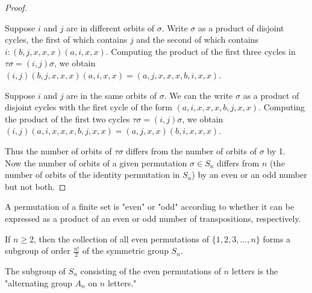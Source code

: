 \documentclass[a4paper,11pt]{article}
\begin{document}
\begin{outline}
\begin{proof}
      \begin{proofcases}
      
        \item 
          Suppose \(i\) and \(j\) are in different orbits of \(\sigma\). Write \(\sigma\) as a product of
          disjoint cycles, the first of which contains \(j\) and the second of which 
          contains \(i: (b, j, x, x, x)(a, i, x, x)\). Computing the product of the first three cycles in
          \(\tau\sigma = (i, j)\sigma\), we obtain\\ \((i, j)(b, j, x, x, x)(a, i, x, x) = (a, j, x, x, x, b, i, x, x)\).
          
        \item
          Suppose \(i\) and \(j\) are in the same orbits of \(\sigma\). We can the write \(\sigma\) as a product of
          disjoint cycles with the first cycle of the form \((a, i, x, x, x, b, j, x, x)\). Computing the product of
          the first two cycles \(\tau\sigma = (i, j)\sigma\), we obtain \((i, j)(a, i, x, x, x, b, j, x, x) =
          (a, j, x, x)(b, i, x, x, x)\).
      
      \end{proofcases}
      
      Thus the number of orbits of \(\tau\sigma\) differs from the number of orbits of \(\sigma\) by 1.\\
      Now the number of orbits of a given permutation \(\sigma \in S_{n}\) differs from \(n\) (the number
      of orbits of the identity permutation in \(S_{n}\)) by an even or an odd number but not both.
      
    \end{proof}
    
    A permutation of a finite set is "even" or "odd" according to whether it can be 
    expressed as a product of an even or odd number of transpositions, respectively.
    
    If \(n \geq 2\), then the collection of all even permutations of \(\{ 1, 2, 3, \ldots, n\}\)
    forms a subgroup of order \(\frac{n!}{2}\) of the symmetric group \(S_{n}\).
    
    The subgroup of \(S_{n}\) consisting of the even permutations of \(n\) letters is the
    "alternating group \(A_{n}\) on \(n\) letters."

\end{outline}
\end{document}

